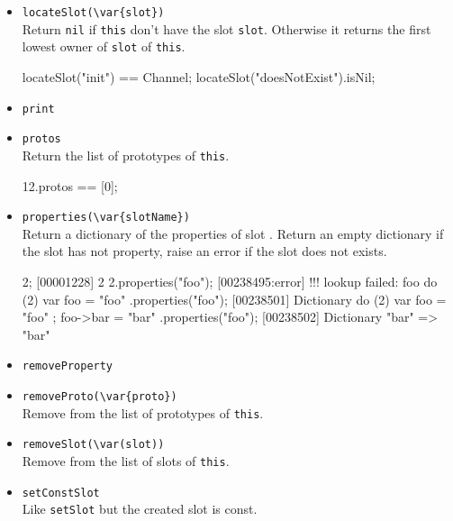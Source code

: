 \begin{itemize}
\item \lstinline|locateSlot(\var{slot})|\\
  Return \lstinline|nil| if \lstinline|this| don't have the slot
  \lstinline|slot|. Otherwise it returns the first lowest owner of
  \lstinline|slot| of \lstinline|this|.

\begin{urbiassert}[firstnumber=last]
locateSlot("init") == Channel;
locateSlot("doesNotExist").isNil;
\end{urbiassert}

\item \lstinline|print|\\

\item \lstinline|protos|\\
  Return the list of prototypes of \lstinline|this|.
\begin{urbiassert}[firstnumber=last]
12.protos == [0];
\end{urbiassert}

\item \lstinline|properties(\var{slotName})|\\
  Return a dictionary of the properties of slot .
  Return an empty dictionary if the slot has not property, raise an
  error if the slot does not exists.
\begin{urbiscript}[firstnumber=last]
2;
[00001228] 2
2.properties("foo");
[00238495:error] !!! lookup failed: foo
do (2) { var foo = "foo" }.properties("foo");
[00238501] Dictionary {}
do (2) { var foo = "foo" ; foo->bar = "bar" }.properties("foo");
[00238502] Dictionary {"bar" => "bar"}
\end{urbiscript}

\item \lstinline|removeProperty|\\

\item \lstinline|removeProto(\var{proto})|\\
  Remove  from the list of prototypes of \lstinline|this|.

\item \lstinline|removeSlot(\var(slot))|\\
  Remove  from the list of slots of \lstinline|this|.

\item \lstinline|setConstSlot|\\
  Like \lstinline|setSlot| but the created slot is const.


\end{itemize}

